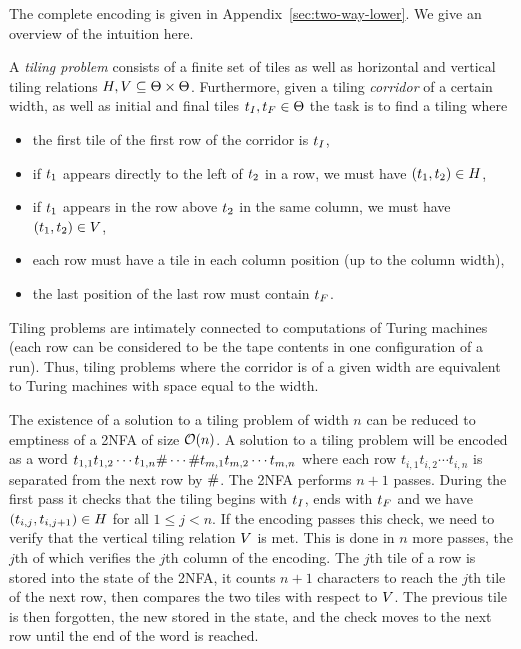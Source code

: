 The complete encoding is given in 
          {Appendix~\ref{sec:two-way-lower}}.
We give an overview of the intuition here.

A \emph{tiling problem} consists of a finite set of tiles \tiles as well as horizontal and vertical tiling relations 
$H, V \subseteq \Theta \times \Theta$.
Furthermore, given a tiling \emph{corridor} of a certain width, as well as initial and final tiles
$t_I, t_F \in \Theta$
the task is to find a tiling where 
\begin{itemize}
\item
    the first tile of the first row of the corridor is $t_I$, 
\item
    if $t_1$ appears directly to the left of $t_2$ in a row, we must have
    $\left( t_1, t_2 \right) \in H$,
\item
    if $t_1$ appears in the row above $t_2$ in the same column, we must have
    $\left( t_1, t_2 \right) \in V$,
\item
    each row must have a tile in each column position (up to the column width),
\item
    the last position of the last row must contain $t_F$.
\end{itemize}
Tiling problems are intimately connected to computations of Turing machines 
(each row can be considered to be the tape contents in one configuration of a run).
Thus, tiling problems where the corridor is of a given width are equivalent to Turing machines with space equal to the width.

The existence of a solution to a tiling problem of width $n$ can be reduced to emptiness of a 2NFA of size 
${\mathcal{O}}\mathord{\left( n \right)}$.
A solution to a tiling problem will be encoded as a word 
$t_{1,1} t_{1,2} \cdots t_{1,n} \# \cdots \# t_{m,1} t_{m,2} \cdots t_{m,n}$
where each row
$t_{i,1} t_{i,2} \cdots t_{i,n}$
is separated from the next row by $\#$.
The 2NFA performs $n+1$ passes.
During the first pass it checks that the tiling begins with $t_I$, ends with $t_F$ and we have 
$\left( t_{i,j}, t_{i,j+1} \right) \in H$
for all
$1 \leq j < n$.
If the encoding passes this check, we need to verify that the vertical tiling relation $V$ is met.
This is done in $n$ more passes, the $j$th of which verifies the $j$th column of the encoding.
The $j$th tile of a row is stored into the state of the 2NFA, it counts $n+1$ characters to reach the $j$th tile of the next row, then compares the two tiles with respect to $V$.
The previous tile is then forgotten, the new stored in the state, and the check moves to the next row until the end of the word is reached.

